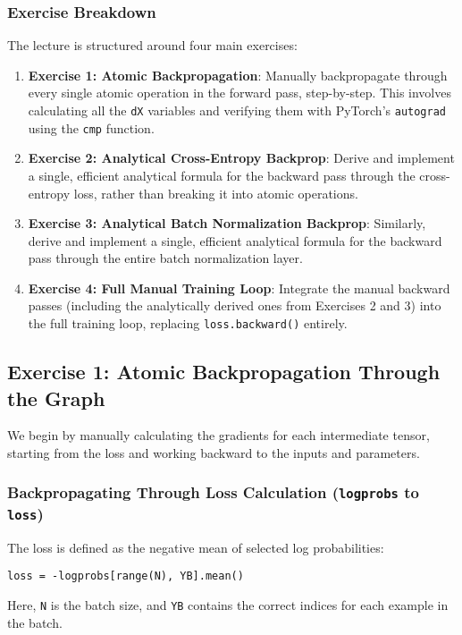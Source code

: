 \subsubsection{Exercise Breakdown}
The lecture is structured around four main exercises:
\begin{enumerate}
    \item \textbf{Exercise 1: Atomic Backpropagation}: Manually backpropagate through every single atomic operation in the forward pass, step-by-step. This involves calculating all the \texttt{dX} variables and verifying them with PyTorch's \texttt{autograd} using the \texttt{cmp} function.
    \item \textbf{Exercise 2: Analytical Cross-Entropy Backprop}: Derive and implement a single, efficient analytical formula for the backward pass through the cross-entropy loss, rather than breaking it into atomic operations.
    \item \textbf{Exercise 3: Analytical Batch Normalization Backprop}: Similarly, derive and implement a single, efficient analytical formula for the backward pass through the entire batch normalization layer.
    \item \textbf{Exercise 4: Full Manual Training Loop}: Integrate the manual backward passes (including the analytically derived ones from Exercises 2 and 3) into the full training loop, replacing \texttt{loss.backward()} entirely.
\end{enumerate}

\subsection{Exercise 1: Atomic Backpropagation Through the Graph}

We begin by manually calculating the gradients for each intermediate tensor, starting from the loss and working backward to the inputs and parameters.

\subsubsection{Backpropagating Through Loss Calculation (\texttt{logprobs} to \texttt{loss})}
The loss is defined as the negative mean of selected log probabilities:
\begin{lstlisting}[caption={Loss Calculation}]
loss = -logprobs[range(N), YB].mean()
\end{lstlisting}
Here, \texttt{N} is the batch size, and \texttt{YB} contains the correct indices for each example in the batch.

